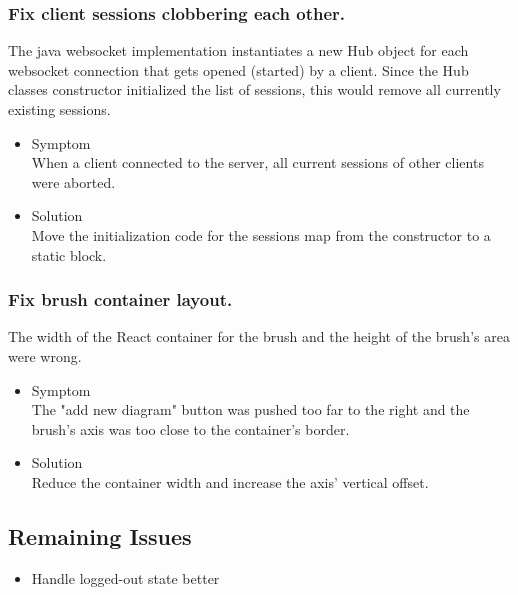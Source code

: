 \documentclass[oneside, english, final]{design}
\begin{document}
\subsubsection{Fix client sessions clobbering each other.}

The java websocket implementation instantiates a new Hub object for each websocket connection that gets opened (started) by a client. Since the Hub classes constructor initialized the list of sessions, this would remove all currently existing sessions.

\begin{itemize}
      \item{Symptom
            \\
            When a client connected to the server, all current sessions of other clients were aborted.
	}
      \item{Solution
            \\
            Move the initialization code for the sessions map from the constructor to a static block.
            }
\end{itemize}
\subsubsection{Fix brush container layout.}

The width of the React container for the brush and the height of the brush's area were wrong.

\begin{itemize}
      \item{Symptom
            \\
            The "add new diagram" button was pushed too far to the right and the brush's axis was too close to the container's border.
	}
      \item{Solution
            \\
            Reduce the container width and increase the axis' vertical offset.
            }
\end{itemize}


\newpage

\subsection{Remaining Issues}
\begin{itemize}
      \item{Handle logged-out state better}
      
\end{itemize}
      
\end{document}
